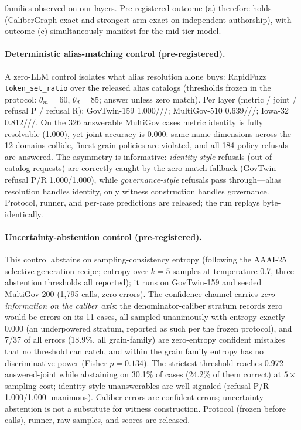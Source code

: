 \documentclass[letterpaper]{article}
\begin{document}
families observed on our layers. Pre-registered outcome (a) therefore holds (CaliberGraph exact and strongest arm exact on independent authorship), with outcome (c) simultaneously manifest for the mid-tier model.

\paragraph{Deterministic alias-matching control (pre-registered).}
A zero-LLM control isolates what alias resolution alone buys: RapidFuzz \texttt{token\_set\_ratio} over the released alias catalogs (thresholds frozen in the protocol: $\theta_m{=}60$, $\theta_d{=}85$; answer unless zero match). Per layer (metric / joint / refusal P / refusal R): GovTwin-159 1.000///; MultiGov-510 0.639///; Iowa-32 0.812///. On the 326 answerable MultiGov cases metric identity is fully resolvable (1.000), yet joint accuracy is 0.000: same-name dimensions across the 12 domains collide, finest-grain policies are violated, and all 184 policy refusals are answered. The asymmetry is informative: \emph{identity-style} refusals (out-of-catalog requests) are correctly caught by the zero-match fallback (GovTwin refusal P/R 1.000/1.000), while \emph{governance-style} refusals pass through---alias resolution handles identity, only witness construction handles governance. Protocol, runner, and per-case predictions are released; the run replays byte-identically.

\paragraph{Uncertainty-abstention control (pre-registered).}
This control abstains on sampling-consistency entropy (following the AAAI-25 selective-generation recipe; entropy over $k{=}5$ samples at temperature 0.7, three abstention thresholds all reported); it runs on GovTwin-159 and seeded MultiGov-200 (1,795 calls, zero errors). The confidence channel carries \emph{zero information on the caliber axis}: the denominator-caliber stratum records zero would-be errors on its 11 cases, all sampled unanimously with entropy exactly 0.000 (an underpowered stratum, reported as such per the frozen protocol), and 7/37 of all errors (18.9\%, all grain-family) are zero-entropy confident mistakes that no threshold can catch, and within the grain family entropy has no discriminative power (Fisher $p{=}0.134$). The strictest threshold reaches 0.972 answered-joint while abstaining on 30.1\% of cases (24.2\% of them correct) at $5\times$ sampling cost; identity-style unanswerables are well signaled (refusal P/R 1.000/1.000 unanimous). Caliber errors are confident errors; uncertainty abstention is not a substitute for witness construction. Protocol (frozen before calls), runner, raw samples, and scores are released.
\end{document}
